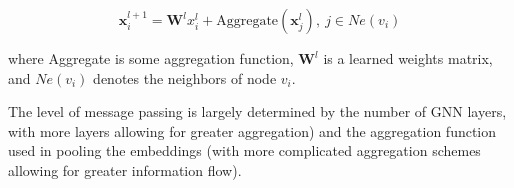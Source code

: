 \begin{equation}
\pmb{x}_i^{l+1} = \pmb{W}^{l}x_i^{l} + \text{Aggregate}(\pmb{x}_j^{l}),\ j \in Ne(v_i)
\end{equation}

where Aggregate is some aggregation function, $\pmb{W}^{l}$ is a learned weights matrix, and $Ne(v_i)$ denotes the neighbors of node $v_i$.

The level of message passing is largely determined by the number of GNN layers, with more layers allowing for greater aggregation) and the aggregation function used in pooling the embeddings (with more complicated aggregation schemes allowing for greater information flow).